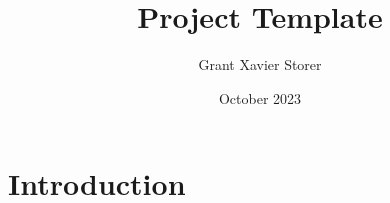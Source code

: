 \documentclass{article}
\title{Project Template}
\author{Grant Xavier Storer}
\date{October 2023}
\begin{document}
\maketitle

\section{Introduction}
\end{document}
